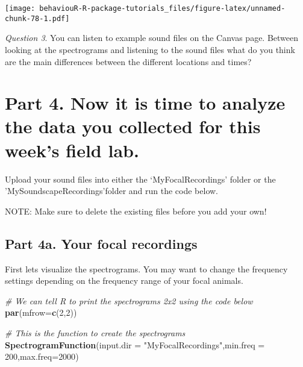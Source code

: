 \documentclass[]{book}
\newenvironment{Shaded}{\begin{snugshade}}{\end{snugshade}}
\newcommand{\CommentTok}[1]{\textcolor[rgb]{0.56,0.35,0.01}{\textit{#1}}}
\newcommand{\DataTypeTok}[1]{\textcolor[rgb]{0.13,0.29,0.53}{#1}}
\newcommand{\DecValTok}[1]{\textcolor[rgb]{0.00,0.00,0.81}{#1}}
\newcommand{\KeywordTok}[1]{\textcolor[rgb]{0.13,0.29,0.53}{\textbf{#1}}}
\newcommand{\NormalTok}[1]{#1}
\newcommand{\StringTok}[1]{\textcolor[rgb]{0.31,0.60,0.02}{#1}}
\begin{document}
\texttt{[image: behaviouR-R-package-tutorials\_files/figure-latex/unnamed-chunk-78-1.pdf]}

\emph{Question 3}. You can listen to example sound files on the Canvas page. Between looking at the spectrograms and listening to the sound files what do you think are the main differences between the different locations and times?

\hypertarget{part-4.-now-it-is-time-to-analyze-the-data-you-collected-for-this-weeks-field-lab.}{%
\section*{Part 4. Now it is time to analyze the data you collected for this week's field lab.}\label{part-4.-now-it-is-time-to-analyze-the-data-you-collected-for-this-weeks-field-lab.}}

Upload your sound files into either the `MyFocalRecordings' folder or the 'MySoundscapeRecordings'folder and run the code below.

NOTE: Make sure to delete the existing files before you add your own!

\hypertarget{part-4a.-your-focal-recordings}{%
\subsection{Part 4a. Your focal recordings}\label{part-4a.-your-focal-recordings}}

First lets visualize the spectrograms. You may want to change the frequency settings depending on the frequency range of your focal animals.

\begin{Shaded}
\begin{Highlighting}[]
\CommentTok{# We can tell R to print the spectrograms 2x2 using the code below}
\KeywordTok{par}\NormalTok{(}\DataTypeTok{mfrow=}\KeywordTok{c}\NormalTok{(}\DecValTok{2}\NormalTok{,}\DecValTok{2}\NormalTok{))}

\CommentTok{# This is the function to create the spectrograms}
\KeywordTok{SpectrogramFunction}\NormalTok{(}\DataTypeTok{input.dir =} \StringTok{"MyFocalRecordings"}\NormalTok{,}\DataTypeTok{min.freq =} \DecValTok{200}\NormalTok{,}\DataTypeTok{max.freq=}\DecValTok{2000}\NormalTok{)}
\end{Highlighting}
\end{Shaded}
\end{document}
